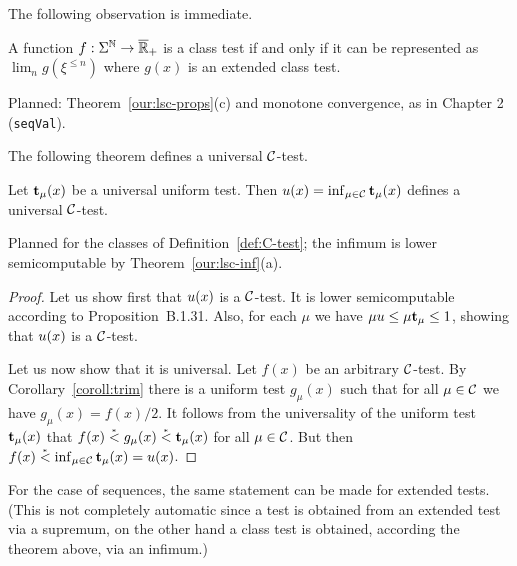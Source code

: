 The following observation is immediate.

 \begin{proposition}
  \label{prop:g4.2.5}
A function \( f:\Sigma^{\mathbb{N}}\to\overline{\mathbb{R}}_{+} \) is a class test if and only if it can be
represented as \( \lim_{n}g(\xi^{\le n}) \) where \( g(x) \) is an extended class test.
 \end{proposition}

\begin{formalization}
Planned: Theorem~\ref{our:lsc-props}(c) and monotone convergence, as in Chapter 2
(\texttt{seqVal}).
\end{formalization}

The following theorem defines a universal \( \mathcal{C} \)-test.

 \begin{theorem}
  \label{thm:g4.2.1}
Let \( \mathbf{t}_{\mu}(x) \) be a universal uniform test.
Then \( u(x) = \inf_{\mu\in\mathcal{C}}\mathbf{t}_{\mu}(x) \) defines a universal \( \mathcal{C} \)-test.
 \end{theorem}

\begin{formalization}
Planned for the classes of Definition~\ref{def:C-test}; the infimum is lower semicomputable by
Theorem~\ref{our:lsc-inf}(a).
\end{formalization}
 \begin{proof}
Let us show first that \( u(x) \) is a \( \mathcal{C} \)-test.
It is lower semicomputable according to Proposition~B.1.31.
Also, for each \( \mu \) we have \( \mu u \le \mu \mathbf{t}_{\mu} \le 1 \), showing that
\( u(x) \) is a \( \mathcal{C} \)-test.

Let us now show that it is universal.
Let \( f(x) \) be an arbitrary \( \mathcal{C} \)-test.
By Corollary~\ref{coroll:trim} there is a uniform test \( g_{\mu}(x) \) such that for
all \( \mu\in\mathcal{C} \) we have \( g_{\mu}(x)=f(x)/2 \).
It follows from the universality of the uniform test \( \mathbf{t}_{\mu}(x) \)
that \( f(x) \stackrel{{}_*}{<} g_{\mu}(x) \stackrel{{}_*}{<}\mathbf{t}_{\mu}(x) \) for all \( \mu\in\mathcal{C} \).
But then \( f(x) \stackrel{{}_*}{<}\inf_{\mu\in\mathcal{C}}\mathbf{t}_{\mu}(x) = u(x) \).
 \end{proof}

For the case of sequences, the same statement can be made for extended tests.
(This is not completely automatic since a test is obtained from an
extended test via a supremum, on the other hand a class test is obtained,
according the theorem above, via an infimum.)


